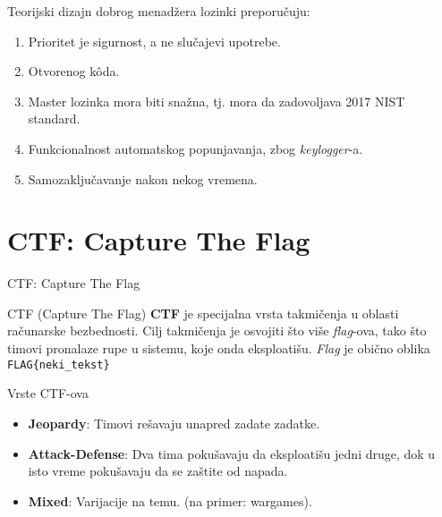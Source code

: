 \documentclass[aspectratio=169,xcolor=dvipsnames]{beamer}
\begin{document}

\begin{frame}{Teorijski dizajn dobrog menadžera lozinki}
    \cite{passman1} preporučuju:

    \begin{enumerate}
            \pause
        \item Prioritet je sigurnost, a ne slučajevi upotrebe.
            \pause
        \item Otvorenog k\^oda.
            \pause
        \item Master lozinka mora biti snažna, tj. mora da zadovoljava 2017
            NIST standard.\cite{nist}
            \pause
        \item Funkcionalnost automatskog popunjavanja, zbog \emph{keylogger}-a.

            \pause
        \item Samozaključavanje nakon nekog vremena.
    \end{enumerate}

\end{frame}

\section{CTF: Capture The Flag}

\begin{frame}{CTF: Capture The Flag}

    \begin{block}{CTF (Capture The Flag)}
        \textbf{CTF} je specijalna vrsta takmičenja u oblasti računarske
        bezbednosti. Cilj takmičenja je osvojiti što više \textit{flag}-ova,
        tako što timovi pronalaze rupe u sistemu, koje onda eksploatišu.
        \textit{Flag} je obično oblika \texttt{FLAG\{neki\_tekst\}}
    \end{block}

\end{frame}


\begin{frame}{Vrste CTF-ova}

    \begin{itemize}
        \item \textbf{Jeopardy}: Timovi rešavaju unapred zadate zadatke.
        \item \textbf{Attack-Defense}: Dva tima pokušavaju da eksploatišu
            jedni druge, dok u isto vreme pokušavaju da se zaštite od napada.
        \item \textbf{Mixed}: Varijacije na temu. (na primer: wargames).
    \end{itemize}

\end{frame}
\end{document}

